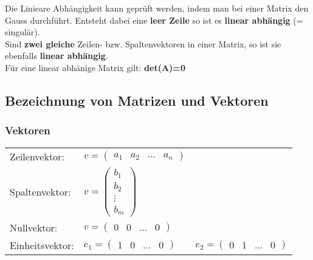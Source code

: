 	Die Linieare Abhängigkeit kann geprüft werden, indem man bei einer Matrix den Gauss durchführt. Entsteht dabei eine \textbf{leer Zeile}	so ist es \textbf{linear abhängig} (= singulär). \\
	Sind \textbf{zwei gleiche} Zeilen- bzw. Spaltenvektoren in einer Matrix, so ist sie ebenfalls \textbf{linear abhängig}. \\
	Für eine linear abhänige Matrix gilt: \textbf{det(A)=0}


\subsection{Bezeichnung von Matrizen und Vektoren}
	\subsubsection{Vektoren}
		\begin{tabular}{ll}
			Zeilenvektor: & $v = \left(\begin{array}{cccc} a_1 & a_2 & \ldots & a_n \end{array}\right)$ \\
			Spaltenvektor: & $v = \left(\begin{array}{c} b_1 \\ b_2 \\ \vdots \\ b_m \end{array}\right)$ \\
			Nullvektor: & $v = \left(\begin{array}{cccc} 0 & 0 & \ldots & 0 \end{array}\right)$\\
			Einheitsvektor: & $e_1 = \left(\begin{array}{cccc} 1 & 0 & \ldots & 0 \end{array}\right) \qquad 
					e_2 = \left(\begin{array}{cccc} 0 & 1 & \ldots & 0 \end{array}\right)$
		\end{tabular}
	

